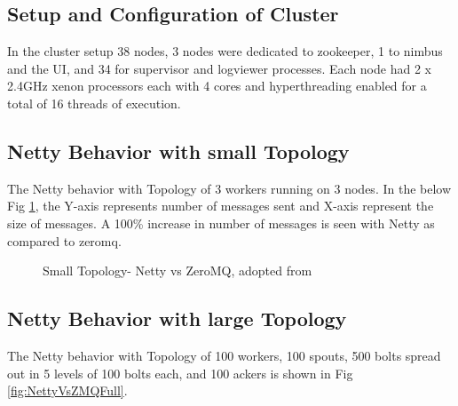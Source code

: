 \documentclass[9pt,twocolumn,twoside]{styles/osajnl}
\begin{document}
\subsection{Setup and Configuration of Cluster}
In the cluster setup 38 nodes, 3 nodes were dedicated to zookeeper, 1
to nimbus and the UI, and 34 for supervisor and logviewer processes.
Each node had 2 x 2.4GHz xenon processors each with 4 cores and
hyperthreading enabled for a total of 16 threads of execution.

\subsection{Netty Behavior with small Topology}
The Netty behavior with Topology of 3 workers running on 3 nodes. In
the below Fig \ref{fig:nettyvzmq-small}, the Y-axis represents number
of messages sent and X-axis represent the size of messages. A 100\%
increase in number of messages is seen with Netty as compared to
zeromq.

\begin{figure}[htbp]
	\centering
	\caption{Small Topology- Netty vs ZeroMQ, adopted from
          \cite{article-storm-netty} }
	\label{fig:nettyvzmq-small}
\end{figure}



\subsection{Netty Behavior with large Topology}
The Netty behavior with Topology of 100 workers, 100 spouts, 500 bolts
spread out in 5 levels of 100 bolts each, and 100 ackers is shown in
Fig \ref{fig:NettyVsZMQFull}.
\end{document}
